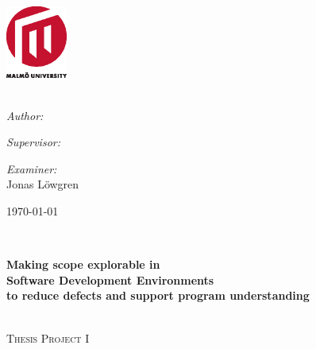 \begin{titlepage}


\begin{center}

\AddToShipoutPicture*{\BackgroundPic}

\includegraphics[width=0.15\textwidth]{./img/mah2.eps}~\\[1cm]

\HRule \\[1.5cm]

\begin{minipage}{0.43\textwidth}
\begin{flushleft} \large
\emph{Author:}\\
\autor
\end{flushleft}
\end{minipage}
\begin{minipage}{0.43\textwidth}
\begin{flushright} \large
\emph{Supervisor:} \\
\supervisor
\end{flushright}
\end{minipage}

\vspace*{0.4cm}

\begin{minipage}{0.86\textwidth}
\begin{flushright} \large
\emph{Examiner:} \\
Jonas Löwgren
\end{flushright}
\end{minipage}

\vspace*{3.5cm}

{\large \today}

\vfill
\begin{minipage}{0.86\textwidth}
\begin{flushleft} \large

\HRule \\[0.4cm]
\begin{spacing}{1.0}
{ \huge \bfseries Making scope explorable in\\Software Development Environments\\[0.4cm]\large{to reduce defects and support program understanding}}
\end{spacing}
\\[0.5cm]
\textsc{\Large Thesis Project I}
\end{flushleft}
\end{minipage}




\end{center}
\end{titlepage}
